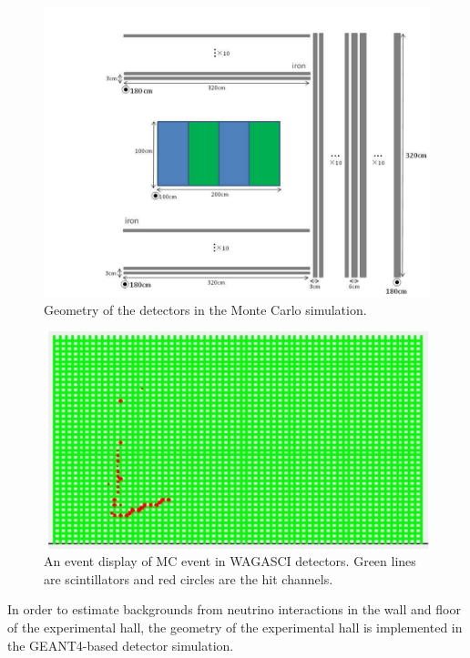 \begin{figure}[tbh]
\begin{center}
\includegraphics[width=0.8\linewidth]{fig/wagasci_mc_geometry.pdf}
\end{center}
\caption{
Geometry of the detectors in the Monte Carlo simulation.}
\label{fig:wagasci_mc_geometry}
\end{figure}

\begin{figure}[tbh]
\begin{center}
\includegraphics[width=0.8\linewidth]{fig/wagasci_event_display.pdf}
\end{center}
\caption{
An event display of MC event in WAGASCI detectors. Green lines are scintillators and red circles are the hit channels.}
\label{fig:wagasci_mc_geometry}
\end{figure}

In order to estimate backgrounds from neutrino interactions in the wall and floor of the experimental hall, the geometry of the experimental hall is implemented in the GEANT4-based detector simulation.


